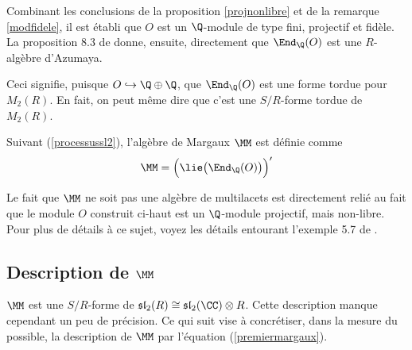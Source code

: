 \begin{Rem} Combinant les conclusions de la proposition \ref{projnonlibre} et de la remarque \ref{modfidele}, il est établi que $O$ est un $\Q$-module de type fini, projectif et fidèle. La proposition 8.3 de \cite{FDnoncom} donne, ensuite, directement que $\End_\Q(O)$ est une $R$-algèbre d'Azumaya.

Ceci signifie, puisque $O \hookrightarrow \Q \oplus \Q$, que $\End_\Q(O)$ est une forme tordue pour $M_2(R)$. En fait, on peut même dire que c'est une $S/R$-forme tordue de $M_2(R)$.
\end{Rem}

\begin{Def} Suivant (\ref{processussl2}), l'algèbre de Margaux $\MM$ est définie comme
\begin{equation} \label{premiermargaux}
\MM = \Big(\lie\big(\End_\Q(O)\big)\Big)'
\end{equation}
\end{Def}

\begin{Rem} Le fait que $\MM$ ne soit pas une algèbre de multilacets est directement relié au fait que le module $O$ construit ci-haut est un $\Q$-module projectif, mais non-libre. Pour plus de détails à ce sujet, voyez les détails entourant l'exemple 5.7 de \cite{GPmar}.
\end{Rem}

%
\subsection{Description de $\MM$}

$\MM$ est une $S/R$-forme de $\mathfrak{sl}_2(R) \cong \mathfrak{sl}_2(\CC) \otimes R$. Cette description manque cependant un peu de précision. Ce qui suit vise à concrétiser, dans la mesure du possible, la description de $\MM$ par l'équation (\ref{premiermargaux}).

